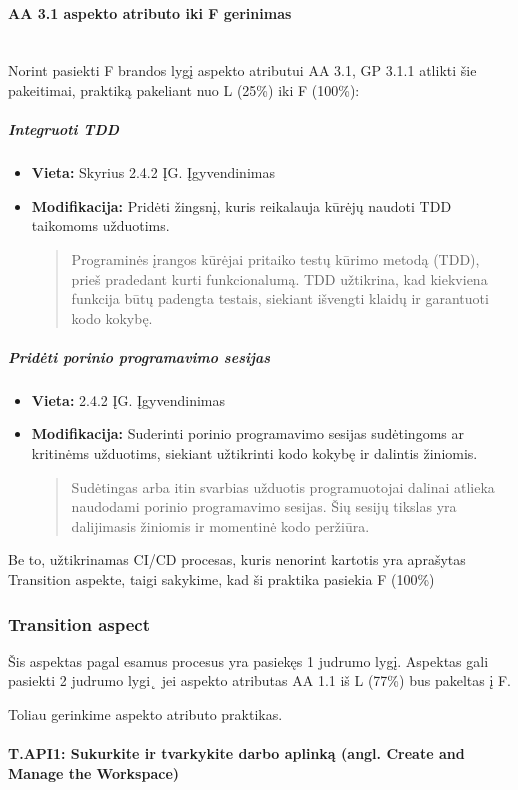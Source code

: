 \documentclass{article}
\newcommand{\subsubsubsection}[1]{\paragraph{#1}\mbox{}\\}
\begin{document}
\subsubsubsection{AA 3.1 aspekto atributo iki F gerinimas}

Norint pasiekti F brandos lygį aspekto atributui AA 3.1, GP 3.1.1 atlikti šie pakeitimai, praktiką pakeliant nuo L (25\%) iki F (100\%):

\subparagraph{Integruoti TDD}
\begin{itemize}
    \item \textbf{Vieta:} Skyrius 2.4.2 ĮG. Įgyvendinimas 
    \item \textbf{Modifikacija:} Pridėti žingsnį, kuris reikalauja kūrėjų naudoti TDD taikomoms užduotims.
    \begin{quote} Programinės įrangos kūrėjai pritaiko testų kūrimo metodą (TDD), prieš pradedant kurti funkcionalumą. TDD užtikrina, kad kiekviena funkcija būtų padengta testais, siekiant išvengti klaidų ir garantuoti kodo kokybę.
    \end{quote}
\end{itemize}

\subparagraph{Pridėti porinio programavimo sesijas}
\begin{itemize}
    \item \textbf{Vieta:} 2.4.2 ĮG. Įgyvendinimas
    \item \textbf{Modifikacija:} Suderinti porinio programavimo sesijas sudėtingoms ar kritinėms užduotims, siekiant užtikrinti kodo kokybę ir dalintis žiniomis.
    \begin{quote} Sudėtingas arba itin svarbias užduotis programuotojai dalinai atlieka naudodami porinio programavimo sesijas. Šių sesijų tikslas yra dalijimasis žiniomis ir momentinė kodo peržiūra.
    \end{quote}
\end{itemize}

Be to, užtikrinamas CI/CD procesas, kuris nenorint kartotis yra aprašytas Transition aspekte, taigi sakykime, kad ši praktika pasiekia F (100\%)

\subsubsection{Transition aspect}

Šis aspektas pagal esamus procesus yra pasiekęs 1 judrumo lygį. Aspektas gali pasiekti 2 judrumo lygi˛ jei aspekto 
atributas AA 1.1 iš L (77\%) bus pakeltas į F.

Toliau gerinkime aspekto atributo praktikas.

\subsubsubsection{T.API1: Sukurkite ir tvarkykite darbo aplinką (angl. Create and Manage the Workspace)}
\end{document}
